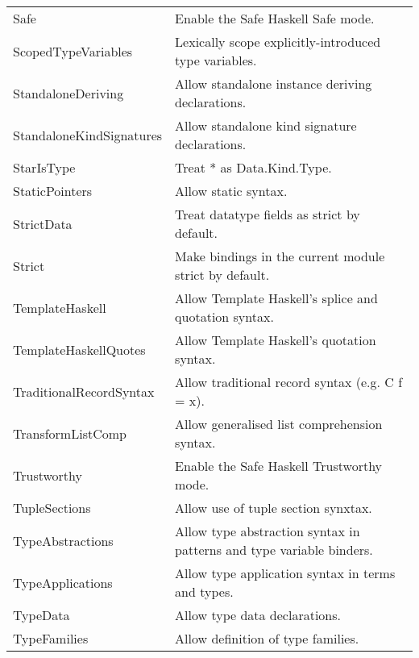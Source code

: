 \documentclass[openany, 12pt]{book}
\begin{document}
\begin{center}
\begin{supertabular}{ll}
		Safe                       & Enable the Safe Haskell Safe mode.                                         \\
		ScopedTypeVariables        & Lexically scope explicitly-introduced type variables.                      \\
		StandaloneDeriving         & Allow standalone instance deriving declarations.                           \\
		StandaloneKindSignatures   & Allow standalone kind signature declarations.                              \\
		StarIsType                 & Treat * as Data.Kind.Type.                                                 \\
		StaticPointers             & Allow static syntax.                                                       \\
		StrictData                 & Treat datatype fields as strict by default.                                \\
		Strict                     & Make bindings in the current module strict by default.                     \\
		TemplateHaskell            & Allow Template Haskell's splice and quotation syntax.                      \\
		TemplateHaskellQuotes      & Allow Template Haskell's quotation syntax.                                 \\
		TraditionalRecordSyntax    & Allow traditional record syntax (e.g. C {f = x}).                          \\
		TransformListComp          & Allow generalised list comprehension syntax.                               \\
		Trustworthy                & Enable the Safe Haskell Trustworthy mode.                                  \\
		TupleSections              & Allow use of tuple section synxtax.                                        \\
		TypeAbstractions           & Allow type abstraction syntax in patterns and type variable binders.       \\
		TypeApplications           & Allow type application syntax in terms and types.                          \\
		TypeData                   & Allow type data declarations.                                              \\
		TypeFamilies               & Allow definition of type families.                                         \\

\end{supertabular}
\end{center}
\end{document}
